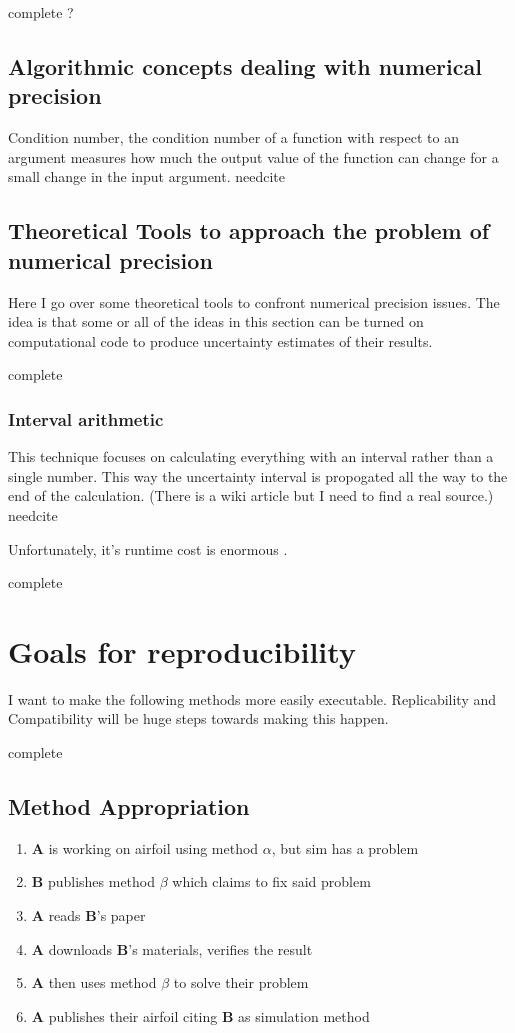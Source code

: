 \documentclass[american]{article}
\newcommand{\complete}{
	\gls{complete}
}
\newcommand{\needcite}{
	\gls{needcite}
}
\begin{document}
\complete?

\subsection{Algorithmic concepts dealing with numerical precision}

Condition number, the condition number of a function with respect to an argument measures how much the output value of the function can change for a small change in the input argument. \needcite

\subsection{Theoretical Tools to approach the problem of numerical precision}

Here I go over some theoretical tools to confront numerical precision issues. The idea is that some or all of the ideas in this section can be turned on computational code to produce uncertainty estimates of their results.

\complete

\subsubsection{Interval arithmetic}

This technique focuses on calculating everything with an interval rather than a single number. This way the uncertainty interval is propogated all the way to the end of the calculation. (There is a wiki article but I need to find a real source.) \needcite

Unfortunately, it's runtime cost is enormous \cite{dhb-numerical-bugs}.

\complete

\section{Goals for reproducibility}

I want to make the following methods more easily executable. Replicability and Compatibility will be huge steps towards making this happen.

\complete

\subsection{Method Appropriation}

\begin{enumerate}
\item \textbf{A} is working on airfoil using method \boldmath$\alpha$, but sim has a problem
\item \textbf{B} publishes method $\beta$ which claims to fix said problem
\item \textbf{A} reads \textbf{B}'s paper
\item \textbf{A} downloads \textbf{B}'s materials, verifies the result
\item \textbf{A} then uses method $\beta$ to solve their problem
\item \textbf{A} publishes their airfoil citing \textbf{B} as simulation method
\end{enumerate}
\end{document}
